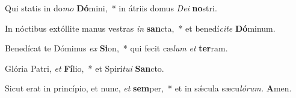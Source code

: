 \item Qui statis in do\textit{mo} \textbf{Dó}mini,~* in átriis domus \textit{Dei} \textbf{no}stri.
\item In nóctibus extóllite manus vestras \textit{in} \textbf{san}cta,~* et benedí\textit{cite} \textbf{Dó}minum.
\item Benedícat te Dóminus \textit{ex} \textbf{Si}on,~* qui fecit cæ\textit{lum} \textit{et} \textbf{ter}ram.
\item Glória Patri, \textit{et} \textbf{Fí}lio,~* et Spirí\tinyhspace\textit{tui} \textbf{San}cto.
\item Sicut erat in princípio, et nunc, \textit{et} \textbf{sem}per,~* et in sǽcula sæcu\tinyhspace\textit{lórum.} \textbf{A}men.
